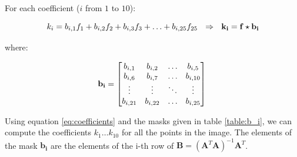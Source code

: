 \documentclass{ipol}
\numberwithin{equation}{section}
\numberwithin{table}{section}
\numberwithin{figure}{section}
\begin{document}
For each coefficient ($i$ from $1$ to $10$):

\begin{equation}
	\label{eq:coefficients}
	k_i = b_{i,1}f_1 + b_{i,2}f_2 + b_{i,3}f_3 + \hdots + b_{i,25}f_{25} \ \ \Rightarrow \ \ \mathbf{k_i} = \mathbf{f}\star\mathbf{b_i}\\
\end{equation}

where:

\begin{equation}
	\label{eq:b_i}
	\mathbf{b_i} = \begin{bmatrix}	b_{i,1}		& b_{i,2}	& \hdots	& b_{i,5}	\\
									b_{i,6}		& b_{i,7}	& \hdots	& b_{i,10}	\\
									\vdots		& \vdots	& \ddots	& \vdots	\\
									b_{i,21}	& b_{i,22}	& \hdots	& b_{i,25}	\\
					\end{bmatrix}\\
\end{equation}

Using equation \ref{eq:coefficients} and the masks given in table \ref{table:b_i}, we can compute 
the coefficients $k_1 \hdots k_{10}$ for all the points in the image. The elements of the mask $\mathbf{b_i}$ 
are the elements of the i-th row of $\mathbf{B} = (\mathbf{A}^T\mathbf{A})^{-1}\mathbf{A}^T$.\\
\end{document}
